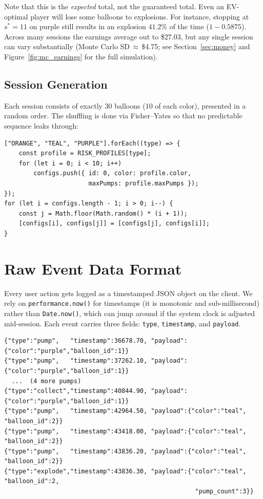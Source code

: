 \documentclass[11pt,a4paper]{article}
\begin{document}
Note that this is the \emph{expected} total, not the guaranteed total.
Even an EV-optimal player will lose some balloons to explosions. For
instance, stopping at $s^* = 11$ on purple still results in an explosion
$41.2\%$ of the time ($1 - 0.5875$). Across many sessions the earnings
average out to \$27.03, but any single session can vary substantially
(Monte Carlo SD\,$\approx$\,\$4.75; see Section~\ref{sec:money} and
Figure~\ref{fig:mc_earnings} for the full simulation).


\subsection{Session Generation}

Each session consists of exactly 30 balloons (10 of each color), presented in a
random order. The shuffling is done via Fisher--Yates so that no predictable
sequence leaks through:

\begin{lstlisting}[style=tsstyle,caption={Shuffle logic (TypeScript).}]
["ORANGE", "TEAL", "PURPLE"].forEach((type) => {
    const profile = RISK_PROFILES[type];
    for (let i = 0; i < 10; i++)
        configs.push({ id: 0, color: profile.color,
                       maxPumps: profile.maxPumps });
});
for (let i = configs.length - 1; i > 0; i--) {
    const j = Math.floor(Math.random() * (i + 1));
    [configs[i], configs[j]] = [configs[j], configs[i]];
}
\end{lstlisting}


\section{Raw Event Data Format}

Every user action gets logged as a timestamped JSON object on the client.
We rely on \texttt{performance.now()} for timestamps (it is monotonic and
sub-millisecond) rather than \texttt{Date.now()}, which can jump around if
the system clock is adjusted mid-session. Each event carries three fields:
\texttt{type}, \texttt{timestamp}, and \texttt{payload}.

\begin{lstlisting}[style=jsonstyle,caption={A handful of raw events from the sample session (\texttt{6fe2f79a}).}]
{"type":"pump",   "timestamp":36678.70, "payload":{"color":"purple","balloon_id":1}}
{"type":"pump",   "timestamp":37262.10, "payload":{"color":"purple","balloon_id":1}}
  ...  (4 more pumps)
{"type":"collect","timestamp":40844.90, "payload":{"color":"purple","balloon_id":1}}
{"type":"pump",   "timestamp":42964.50, "payload":{"color":"teal",  "balloon_id":2}}
{"type":"pump",   "timestamp":43418.00, "payload":{"color":"teal",  "balloon_id":2}}
{"type":"pump",   "timestamp":43836.20, "payload":{"color":"teal",  "balloon_id":2}}
{"type":"explode","timestamp":43836.30, "payload":{"color":"teal",  "balloon_id":2,
                                                    "pump_count":3}}
\end{lstlisting}
\end{document}
